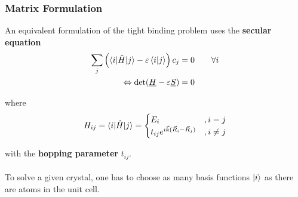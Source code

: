 \documentclass{article}
\newcommand{\lr}[1]{\left(#1\right)}
\begin{document}
\newpage


\subsubsection{Matrix Formulation}
An equivalent formulation of the tight binding problem uses the \textbf{secular equation}
	\begin{align}
		\sum_j \lr{ \braket{ i | \hat{H} | j } - \varepsilon \braket{i | j} } c_j &= 0 \qquad \forall i \\
		\Leftrightarrow \det(\underline{H} - \varepsilon \underline{S}) &= 0
	\end{align}

where
	\begin{equation}
		H_{ij} = \braket{i|\hat{H}|j} =
		\begin{cases}
			E_i &, i=j \\
			t_{ij} e^{i \vec{k} (\vec{R}_i - \vec{R}_j)} &, i\neq j
		\end{cases}
	\end{equation}

with the \textbf{hopping parameter} $t_{ij}$.\\
\\
To solve a given crystal, one has to choose as many basis functions $\ket{i}$ as there are atoms in the unit cell.

\vspace{0.5cm}
\end{document}
